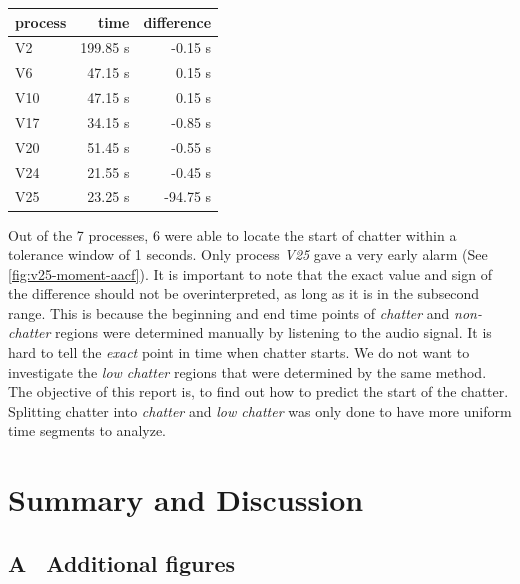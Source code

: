 \documentclass[12 pt]{scrartcl}
\begin{document}
\begin{table}[ht]
  \centering
  \label{tab:pointdiff}
  \begin{tabular}{l|rr}
    \\
    process & time     & difference \\
    \hline
    V2      & 199.85 s & -0.15 s    \\
    V6      & 47.15 s  & 0.15 s     \\
    V10     & 47.15 s  & 0.15 s     \\
    V17     & 34.15 s  & -0.85 s    \\
    V20     & 51.45 s  & -0.55 s    \\
    V24     & 21.55 s  & -0.45 s    \\
    V25     & 23.25 s  & -94.75 s   \\
  \end{tabular}
\end{table}

Out of the 7 processes, 6 were able to locate the start of chatter within a tolerance window of 1 seconds. Only process \emph{V25} gave a very early alarm (See \ref{fig:v25-moment-aacf}).
It is important to note that the exact value and sign of the difference should not be overinterpreted, as long as it is in the subsecond range. This is because the beginning and end time points of \emph{chatter} and \emph{non-chatter} regions were determined manually by listening to the audio signal. It is hard to tell the \emph{exact} point in time when chatter starts.
We do not want to investigate the \emph{low chatter} regions that were determined by the same method. The objective of this report is, to find out how to predict the start of the chatter. Splitting chatter into \emph{chatter} and \emph{low chatter} was only done to have more uniform time segments to analyze.

\section{Summary and Discussion}


\newpage
{}
\renewcommand\refname{Bibliography}


\newpage
\appendix
{}
\subsection*{A \ Additional figures}
\end{document}
